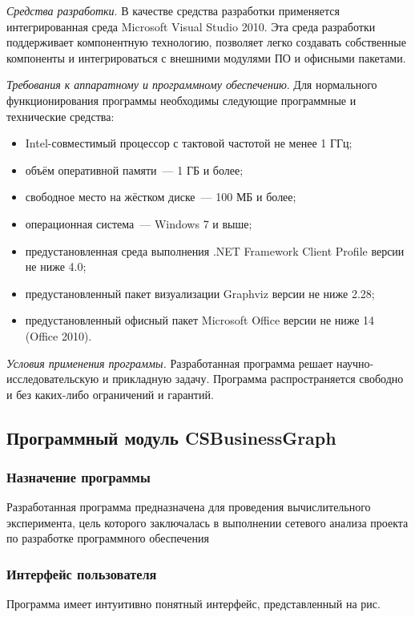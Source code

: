 \textit{Средства разработки}. В качестве средства разработки применяется интегрированная среда Microsoft Visual Studio 2010. Эта среда разработки поддерживает компонентную технологию, позволяет легко создавать собственные компоненты и интегрироваться с внешними модулями ПО и офисными пакетами.

\textit{Требования к аппаратному и программному обеспечению}. Для нормального функционирования программы необходимы следующие программные и технические средства:
\begin{itemize}
  \item Intel-совместимый процессор с тактовой частотой не менее 1 ГГц;
  \item объём оперативной памяти~--- 1 ГБ и более;
  \item свободное место на жёстком диске~--- 100 МБ и более;
  \item операционная система~--- Windows 7 и выше;
  \item предустановленная среда выполнения .NET Framework Client Profile версии не ниже 4.0;
  \item предустановленный пакет визуализации Graphviz версии не ниже 2.28;
  \item предустановленный офисный пакет Microsoft Office версии не ниже 14 (Office 2010).
\end{itemize}

\textit{Условия применения программы.} Разработанная программа решает научно-исследовательскую и прикладную задачу. Программа распространяется свободно и без каких-либо ограничений и гарантий.

\subsection{Программный модуль CSBusinessGraph}

\subsubsection*{Назначение программы}

Разработанная программа предназначена для проведения вычислительного эксперимента, цель которого заключалась в выполнении сетевого анализа проекта по разработке программного обеспечения

\subsubsection*{Интерфейс пользователя}
Программа имеет интуитивно понятный интерфейс, представленный на рис.

